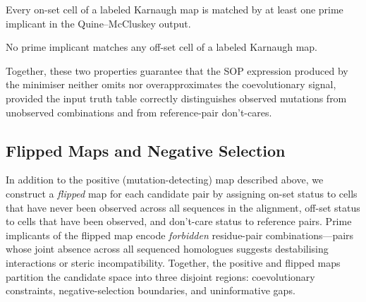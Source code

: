 \begin{theorem}
	\label{thm:cover-complete}
	Every on-set cell of a labeled Karnaugh map is matched by at least one prime
	implicant in the Quine--McCluskey output.
\end{theorem}

\begin{theorem}
	\label{thm:cover-sound}
	No prime implicant matches any off-set cell of a labeled Karnaugh map.
\end{theorem}

Together, these two properties guarantee that the SOP expression produced by
the minimiser neither omits nor overapproximates the coevolutionary signal,
provided the input truth table correctly distinguishes observed mutations
from unobserved combinations and from reference-pair don't-cares.

\subsection{Flipped Maps and Negative Selection}
\label{sec:flipped-maps}

In addition to the positive (mutation-detecting) map described above, we
construct a \emph{flipped} map for each candidate pair by assigning on-set
status to cells that have never been observed across all sequences in the
alignment, off-set status to cells that have been observed, and don't-care
status to reference pairs.  Prime implicants of the flipped map encode
\emph{forbidden} residue-pair combinations---pairs whose joint absence across
all sequenced homologues suggests destabilising interactions or steric
incompatibility.  Together, the positive and flipped maps partition the
candidate space into three disjoint regions: coevolutionary constraints,
negative-selection boundaries, and uninformative gaps.
